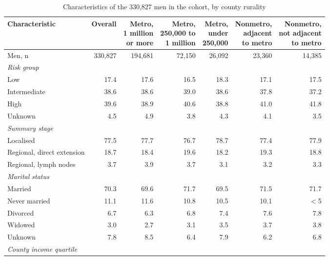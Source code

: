 \begin{table}[tbp]
\centering\sffamily
\footnotesize
\setlength{\tabcolsep}{6pt}
\caption{Characteristics of the 330,827 men in the cohort, by county rurality}
\label{tab:cohort}
\begin{tabular}{@{}l*{6}{r}@{}}
\toprule
\rowcolor{tablehead}Characteristic & Overall & \makecell[r]{Metro,\\1 million\\or more} & \makecell[r]{Metro,\\250,000 to\\1 million} & \makecell[r]{Metro,\\under\\250,000} & \makecell[r]{Nonmetro,\\adjacent\\to metro} & \makecell[r]{Nonmetro,\\not adjacent\\to metro} \\
\midrule
Men, n & 330,827 & 194,681 & 72,150 & 26,092 & 23,360 & 14,385 \\
\textit{Risk group} &  &  &  &  &  &  \\
\quad Low & 17.4 & 17.6 & 16.5 & 18.3 & 17.1 & 17.5 \\
\quad Intermediate & 38.6 & 38.6 & 39.0 & 38.6 & 37.8 & 37.2 \\
\quad High & 39.6 & 38.9 & 40.6 & 38.8 & 41.0 & 41.8 \\
\quad Unknown & 4.5 & 4.9 & 3.8 & 4.3 & 4.1 & 3.5 \\
\textit{Summary stage} &  &  &  &  &  &  \\
\quad Localised & 77.5 & 77.7 & 76.7 & 78.7 & 77.4 & 77.9 \\
\quad Regional, direct extension & 18.7 & 18.4 & 19.6 & 18.2 & 19.3 & 18.8 \\
\quad Regional, lymph nodes & 3.7 & 3.9 & 3.7 & 3.1 & 3.2 & 3.3 \\
\textit{Marital status} &  &  &  &  &  &  \\
\quad Married & 70.3 & 69.6 & 71.7 & 69.5 & 71.5 & 71.7 \\
\quad Never married & 11.1 & 11.6 & 10.8 & 10.5 & 10.1 & $<$5 \\
\quad Divorced & 6.7 & 6.3 & 6.8 & 7.4 & 7.6 & 7.8 \\
\quad Widowed & 3.0 & 2.7 & 3.1 & 3.5 & 3.7 & 3.8 \\
\quad Unknown & 7.8 & 8.5 & 6.4 & 7.9 & 6.2 & 6.8 \\
\textit{County income quartile} &  &  &  &  &  &  \\

\end{tabular}
\end{table}
